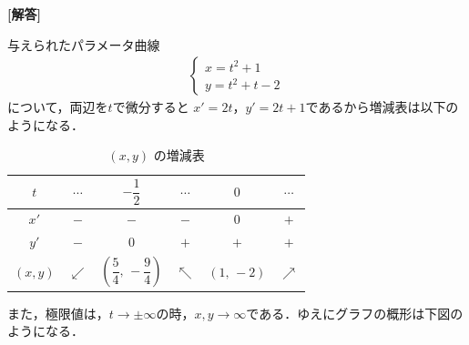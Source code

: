 \documentclass[../../main.tex]{subfiles}
\begin{document}
\begin{oframed}
  
\end{oframed}

{\bf [解答]}

与えられたパラメータ曲線
\begin{align}
  \begin{cases}
    x = t^2 + 1 \\
    y = t^2+t-2
  \end{cases}
\end{align}
について，両辺を$t$で微分すると
$x'=2t$，$y'=2t+1$であるから増減表は以下のようになる．

\begin{table}[htb]
  \centering
  \caption{$(x,y)$ の増減表}
  \begin{tabular}{c|ccccc}
    $t$ & $\cdots$ & $-\dfrac{1}{2}$ & $\cdots$ & $0$ & $\cdots$ \\
    \hline
    $x'$ & $-$ & $-$ & $-$ & $0$ & $+$ \\
    \hline
    $y'$ & $-$ & $0$ & $+$ & $+$ & $+$ \\
    \hline
    $(x,y)$ & $\swarrow$ & $\left(\dfrac{5}{4},\,-\dfrac{9}{4}\right)$ & $\nwarrow$ & $(1,\,-2)$ & $\nearrow$
  \end{tabular}
\end{table}

また，極限値は，$t\to\pm\infty$の時，$x,y\to\infty$である．ゆえにグラフの概形は下図のようになる．
\end{document}
